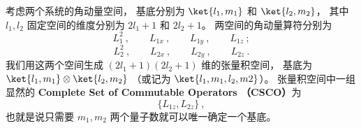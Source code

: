 
\begin{issues}
\issueAbstract
\end{issues}


考虑两个系统的角动量空间， 基底分别为 $\ket{l_1, m_1}$ 和 $\ket{l_2, m_2}$， 其中 $l_1, l_2$ 固定空间的维度分别为 $2l_1+1$ 和 $2l_2+1$。 两空间的角动量算符分别为
\begin{equation}\label{eq_AMAdd_1}
L_1^2~, \qquad L_{1x}~, \qquad L_{1y}~, \qquad L_{1z}~;
\end{equation}
\begin{equation}\label{eq_AMAdd_7}
L_2^2~, \qquad L_{2x}~, \qquad L_{2y}~, \qquad L_{2z}~.
\end{equation}
我们用这两个空间生成 $(2l_1+1)(2l_2+1)$ 维的张量积空间， 基底为 $\ket{l_1, m_1}\otimes\ket{l_2, m_2}$ （或记为 $\ket{l_1, m_1, l_2, m2}$）。 张量积空间中一组显然的 \textbf{Complete Set of Commutable Operators （CSCO）}为 %
\begin{equation}
\{L_{1z}, L_{2z}\}~,
\end{equation}
也就是说只需要 $m_1, m_2$ 两个量子数就可以唯一确定一个基底。


